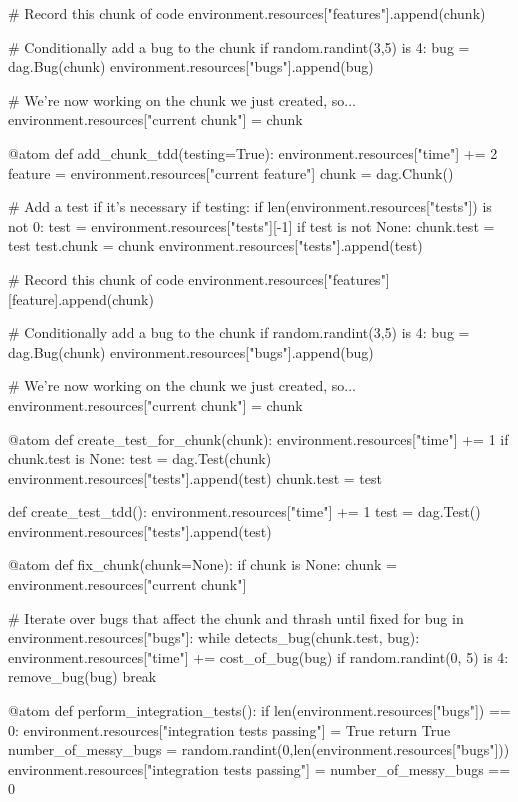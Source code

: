 \begin{appendices}
\begin{pyglist}[language = python, caption={Atoms used in experiments}, listingname=\textbf{Code Listing} \comment{, fvset={frame=single,framerule=1pt}}, numbers=left]
    # Record this chunk of code
    environment.resources["features"].append(chunk)

    # Conditionally add a bug to the chunk
    if random.randint(3,5) is 4:
        bug = dag.Bug(chunk)
        environment.resources["bugs"].append(bug)

    # We're now working on the chunk we just created, so...
    environment.resources["current chunk"] = chunk


@atom
def add_chunk_tdd(testing=True):
    environment.resources["time"] += 2
    feature = environment.resources["current feature"]
    chunk = dag.Chunk()

    # Add a test if it's necessary
    if testing:
        if len(environment.resources["tests"]) is not 0:
            test = environment.resources["tests"][-1]
            if test is not None:
                chunk.test = test
                test.chunk = chunk
                environment.resources["tests"].append(test)

    # Record this chunk of code
    environment.resources["features"][feature].append(chunk)

    # Conditionally add a bug to the chunk
    if random.randint(3,5) is 4:
        bug = dag.Bug(chunk)
        environment.resources["bugs"].append(bug)

    # We're now working on the chunk we just created, so...
    environment.resources["current chunk"] = chunk


@atom
def create_test_for_chunk(chunk):
    environment.resources["time"] += 1
    if chunk.test is None:
        test = dag.Test(chunk)
        environment.resources["tests"].append(test)
        chunk.test = test

def create_test_tdd():
    environment.resources["time"] += 1
    test = dag.Test()
    environment.resources["tests"].append(test)


@atom
def fix_chunk(chunk=None):
    if chunk is None: chunk = environment.resources["current chunk"]

    # Iterate over bugs that affect the chunk and thrash until fixed
    for bug in environment.resources["bugs"]:
        while detects_bug(chunk.test, bug):
            environment.resources["time"] += cost_of_bug(bug)
            if random.randint(0, 5) is 4:
                remove_bug(bug)
                break


@atom
def perform_integration_tests():
    if len(environment.resources["bugs"]) == 0:
        environment.resources["integration tests passing"] = True
        return True
    number_of_messy_bugs = random.randint(0,len(environment.resources["bugs"]))
    environment.resources["integration tests passing"] = number_of_messy_bugs == 0


\end{pyglist}
\end{appendices}
